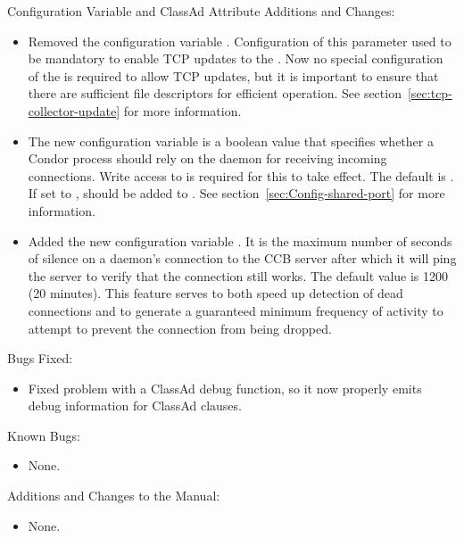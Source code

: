 \noindent Configuration Variable and ClassAd Attribute Additions and Changes:

\begin{itemize}

\item Removed the configuration variable 
  .
  Configuration of this parameter used to be mandatory to enable TCP updates
  to the .  Now no special configuration of the
   is required to allow TCP updates, but it is
  important to ensure that there are sufficient file descriptors for
  efficient operation.  See section~\ref{sec:tcp-collector-update} for
  more information.

\item The new configuration variable  
  is a boolean value that specifies
  whether a Condor process should rely on the  daemon for
  receiving incoming connections.  Write access to
   is required for this to take effect.
  The default is .  If set to , 
  should be added to .  See
  section~\ref{sec:Config-shared-port} for more information.

\item Added the new configuration variable .
  It is the maximum
  number of seconds of silence on a daemon's connection to the CCB server
  after which it will ping the server to verify that the connection still
  works.  
  The default value is 1200 (20 minutes).
  This feature serves to both speed
  up detection of dead connections and to generate a guaranteed minimum
  frequency of activity to attempt to prevent the connection from being
  dropped.

\end{itemize}

\noindent Bugs Fixed:

\begin{itemize}

\item Fixed problem with a ClassAd debug function,
so it now properly emits debug information for ClassAd 
clauses.

\end{itemize}

\noindent Known Bugs:

\begin{itemize}

\item None.

\end{itemize}

\noindent Additions and Changes to the Manual:

\begin{itemize}

\item None.

\end{itemize}
